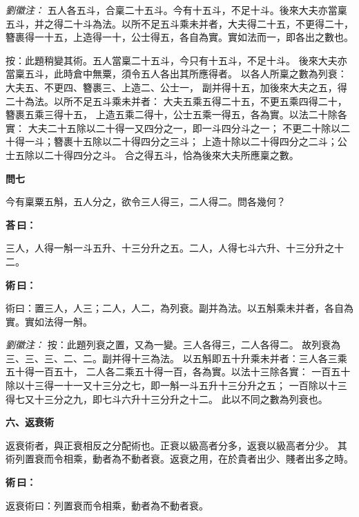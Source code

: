 \documentclass[11pt,a4paper]{article}
\newenvironment{problem}[1][]{%
  \par\vspace{0.6em}\noindent\textcolor{problemcolor}{\textbf{問\ignorespaces#1\unskip}\hspace{0.5em}}%
  \ignorespaces
}{\par\vspace{0.4em}}
\newenvironment{answer}{%
  \par\noindent\textcolor{answercolor}{\textbf{荅\,曰：}}%
  \ignorespaces
}{\par\vspace{0.3em}}
\newenvironment{method}{%
  \par\noindent\textcolor{methodcolor}{\textbf{術\,曰：}}%
  \ignorespaces
}{\par\vspace{0.4em}}
\newenvironment{liuhuicomm}{%
  \par\vspace{0.3em}\noindent\textcolor{commentarycolor}{\small\textit{劉徽注：}}}%
  {\par\vspace{0.5em}}
\begin{document}
\begin{liuhuicomm}
五人各五斗，合稟二十五斗。今有十五斗，不足十斗。後來大夫亦當稟五斗，并之得二十斗為法。以所不足五斗乘未并者，大夫得二十五，不更得二十，簪裹得一十五，上造得一十，公士得五，各自為實。實如法而一，即各出之數也。

按：此題稍變其術。五人當稟二十五斗，今只有十五斗，不足十斗。
後來大夫亦當稟五斗，此時倉中無粟，須令五人各出其所應得者。
以各人所稟之數為列衰：大夫五、不更四、簪裹三、上造二、公士一，
副并得十五，加後來大夫之五，得二十為法。以所不足五斗乘未并者：
大夫五乘五得二十五，不更五乘四得二十，簪裹五乘三得十五，
上造五乘二得十，公士五乘一得五，各為實。以法二十除各實：
大夫二十五除以二十得一又四分之一，即一斗四分斗之一；
不更二十除以二十得一斗；簪裹十五除以二十得四分之三斗；
上造十除以二十得四分之二斗；公士五除以二十得四分之斗。
合之得五斗，恰為後來大夫所應稟之數。
\end{liuhuicomm}

\begin{problem}[七]
今有稟粟五斛，五人分之，欲令三人得三，二人得二。問各幾何？
\end{problem}

\begin{answer}
三人，人得一斛一斗五升、十三分升之五。二人，人得七斗六升、十三分升之十二。
\end{answer}

\begin{method}
術曰：置三人，人三；二人，人二，為列衰。副并為法。以五斛乘未并者，各自為實。實如法得一斛。
\end{method}

\begin{liuhuicomm}
按：此題列衰之置，又為一變。三人各得三，二人各得二。
故列衰為三、三、三、二、二。副并得十三為法。
以五斛即五十升乘未并者：三人各三乘五十得一百五十，
二人各二乘五十得一百，各為實。以法十三除各實：
一百五十除以十三得一十一又十三分之七，即一斛一斗五升十三分升之五；
一百除以十三得七又十三分之九，即七斗六升十三分升之十二。
此以不同之數為列衰也。
\end{liuhuicomm}

\vspace{0.8em}
\noindent\textbf{\large 六、返衰術}
\vspace{0.5em}

\noindent 返衰術者，與正衰相反之分配術也。正衰以級高者分多，返衰以級高者分少。
其術列置衰而令相乘，動者為不動者衰。返衰之用，在於貴者出少、賤者出多之時。

\begin{method}
返衰術曰：列置衰而令相乘，動者為不動者衰。
\end{method}
\end{document}
